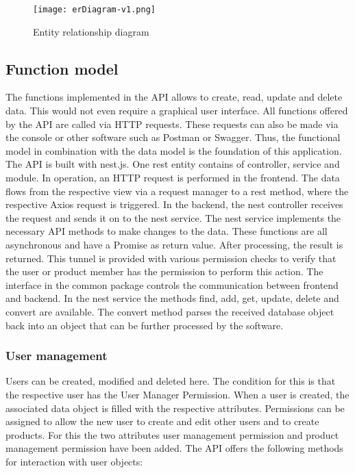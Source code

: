     \begin{figure}[h]
        \centering
        \texttt{[image: erDiagram-v1.png]}
        \caption{Entity relationship diagram}
        \label{fig: erDiagram}
    \end{figure}

    \subsection*{Function model} 
    The functions implemented in the API allows to create, read, update and delete data. This would not even require a graphical user interface. All functions offered by the API are called via HTTP requests. These requests can also be made via the console or other software such as Postman or Swagger. Thus, the functional model in combination with the data model is the foundation of this application. The API is built with nest.js. One rest entity contains of controller, service and module. In operation, an HTTP request is performed in the frontend. The data flows from the respective view via a request manager to a rest method, where the respective Axios request is triggered. In the backend, the nest controller receives the request and sends it on to the nest service. The nest service implements the necessary API methods to make changes to the data. These functions are all asynchronous and have a Promise as return value. After processing, the result is returned. This tunnel is provided with various permission checks to verify that the user or product member has the permission to perform this action. The interface in the common package controls the communication between frontend and backend. In the nest service the methods find, add, get, update, delete and convert are available. The convert method parses the received database object back into an object that can be further processed by the software.

    \subsubsection*{User management}

    Users can be created, modified and deleted here. The condition for this is that the respective user has the User Manager Permission. When a user is created, the associated data object is filled with the respective attributes. Permissions can be assigned to allow the new user to create and edit other users and to create products. For this the two attributes user management permission and product management permission have been added. The API offers the following methods for interaction with user objects:
    
